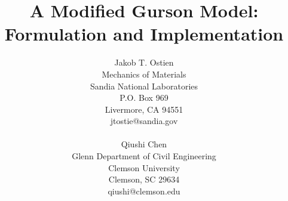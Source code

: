\documentclass[pdf,12pt,report]{SANDreport}
\title{A Modified Gurson Model: Formulation and Implementation}
\author{Jakob T. Ostien \\
	  Mechanics of Materials \\
	  Sandia National Laboratories\\
	  P.O. Box 969 \\
	  Livermore, CA 94551 \\
	  jtostie@sandia.gov \\
	  \\
	  Qiushi Chen \\
	  Glenn Department of Civil Engineering \\
	  Clemson University \\
	  Clemson, SC 29634 \\
	  qiushi@clemson.edu	  
	 }
\date{}
\numberwithin{algorithm}{chapter}
\begin{document}
    \maketitle

    \begin{abstract}
	
    \end{abstract}




    \cleardoublepage		%
    \tableofcontents
    \listoffigures
    \listoftables




\end{document}
